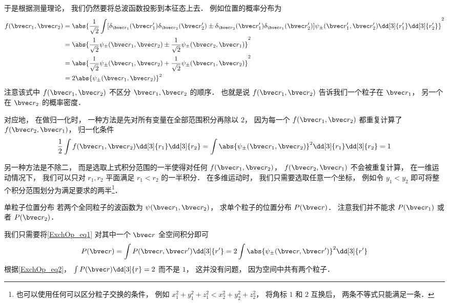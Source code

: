 于是根据测量理论， 我们仍然要将总波函数投影到本征态上去． 例如位置的概率分布为
\begin{equation}\label{ExchOp_eq1}
\begin{aligned}
f(\bvec r_1, \bvec r_2) &= \abs{\frac{1}{\sqrt{2}}\int [\delta_{\bvec r_1}(\bvec r'_1) \delta_{\bvec r_2}(\bvec r'_2) \pm \delta_{\bvec r_2}(\bvec r'_1) \delta_{\bvec r_1}(\bvec r'_2)] \psi_\pm(\bvec r'_1,\bvec r'_2) \dd[3]{r'_1}\dd[3]{r'_2}}^2\\
&= \abs{\frac{1}{\sqrt{2}} \psi_\pm(\bvec r_1, \bvec r_2) \pm  \frac{1}{\sqrt{2}} \psi_\pm(\bvec r_2, \bvec r_1)}^2\\
&= \abs{\frac{1}{\sqrt{2}} \psi_\pm(\bvec r_1, \bvec r_2) +  \frac{1}{\sqrt{2}} \psi_\pm(\bvec r_1, \bvec r_2)}^2\\
&= 2\abs{\psi_\pm(\bvec r_1, \bvec r_2)}^2
\end{aligned}
\end{equation}
注意该式中 $f(\bvec r_1, \bvec r_2)$ 不区分 $\bvec r_1, \bvec r_2$ 的顺序． 也就是说 $f(\bvec r_1, \bvec r_2)$ 告诉我们一个粒子在 $\bvec r_1$， 另一个在 $\bvec r_2$ 的概率密度．

对应地， 在做归一化时， 一种方法是先对所有变量在全部范围积分再除以 $2$， 因为每一个 $f(\bvec r_1, \bvec r_2)$ 都重复计算了 $f(\bvec r_2, \bvec r_1)$， 归一化条件
\begin{equation}\label{ExchOp_eq2}
\frac{1}{2}\int f(\bvec r_1, \bvec r_2) \dd[3]{r_1}\dd[3]{r_2} = \int \abs{\psi_\pm(\bvec r_1, \bvec r_2)}^2 \dd[3]{r_1}\dd[3]{r_2} = 1
\end{equation}

另一种方法是不除二， 而是选取上式积分范围的一半使得对任何 $f(\bvec r_1, \bvec r_2)$， $f(\bvec r_2, \bvec r_1)$ 不会被重复计算， 在一维运动情况下， 我们可以只对 $r_1, r_2$ 平面满足 $r_1 < r_2$ 的一半积分． 在多维运动时， 我们只需要选取任意一个坐标， 例如令 $y_1 < y_2$ 即可将整个积分范围划分为满足要求的两半\footnote{也可以使用任何可以区分粒子交换的条件， 例如 $x_1^2 + y_1^2 + z_1^2 < x_2^2 + y_2^2 + z_2^2$， 将角标 $1$ 和 $2$ 互换后， 两条不等式只能满足一条．}．

\begin{example}{单粒子位置分布}\label{ExchOp_ex1}
若两个全同粒子的波函数为 $\psi(\bvec r_1,\bvec r_2)$， 求单个粒子的位置分布 $P(\bvec r)$． 注意我们并不能求 $P(\bvec r_1)$ 或者 $P(\bvec r_2)$．

我们只需要将\autoref{ExchOp_eq1} 对其中一个 $\bvec r$ 全空间积分即可
\begin{equation}
P(\bvec r) = \int P(\bvec r, \bvec r') \dd[3]{r'} = 2\int \abs{\psi_\pm(\bvec r, \bvec r')}^2 \dd[3]{r'} 
\end{equation}
根据\autoref{ExchOp_eq2}， $\int P(\bvec r) \dd[3]{r} = 2$ 而不是 $1$， 这并没有问题， 因为空间中共有两个粒子．
\end{example}

